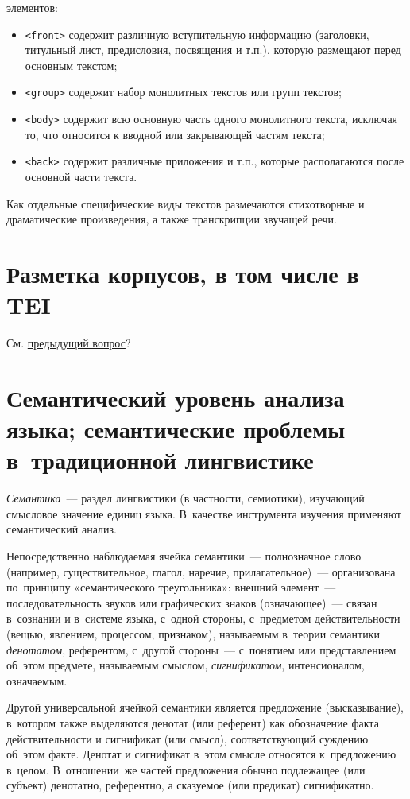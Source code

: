 \documentclass[12pt]{article}
\theoremstyle{definition}
\theoremstyle{remark}
\numberwithin{equation}{section}
\begin{document}
элементов:
\begin{itemize}
\item \texttt{<front>} содержит различную вступительную информацию (заголовки, титульный лист,
предисловия, посвящения и т.п.), которую размещают перед основным текстом;
\item \texttt{<group>} содержит набор монолитных текстов или групп текстов;
\item \texttt{<body>} содержит всю основную часть одного монолитного текста, исключая то, что
относится к вводной или закрывающей частям текста;
\item \texttt{<back>} содержит различные приложения и т.п., которые располагаются после основной
части текста.
\end{itemize}
Как отдельные специфические виды текстов размечаются стихотворные и драматические произведения, а также транскрипции звучащей речи.

\section{Разметка корпусов, в том числе в TEI}

См. \hyperref[sec:TEI]{предыдущий вопрос}?

\section{Семантический уровень анализа языка; семантические проблемы 
в~традиционной лингвистике}
\textsl{Семантика}~--- раздел лингвистики (в частности, семиотики), 
изучающий смысловое значение единиц языка. В~качестве инструмента 
изучения применяют семантический анализ.

Непосредственно наблюдаемая ячейка семантики~--- полнозначное слово 
(например, существительное, глагол, наречие, прилагательное)~--- 
организована по~принципу «семантического треугольника»: внешний 
элемент~--- последовательность звуков или графических знаков 
(означающее)~--- связан в~сознании и в~системе языка, с~одной стороны, 
с~предметом действительности (вещью, явлением, процессом, признаком), 
называемым в~теории семантики {\sl денотатом}, референтом, с~другой стороны~--- 
с~понятием или представлением об~этом предмете, называемым смыслом, 
{\sl сигнификатом}, интенсионалом, означаемым.

Другой универсальной ячейкой семантики является предложение (высказывание), 
в~котором также выделяются денотат (или референт) как обозначение факта 
действительности и сигнификат (или смысл), соответствующий суждению об~этом 
факте. Денотат и сигнификат в~этом смысле относятся к~предложению в~целом. 
В~отношении~же частей предложения обычно подлежащее (или субъект) денотатно, 
референтно, а сказуемое (или предикат) сигнификатно.
\end{document}
